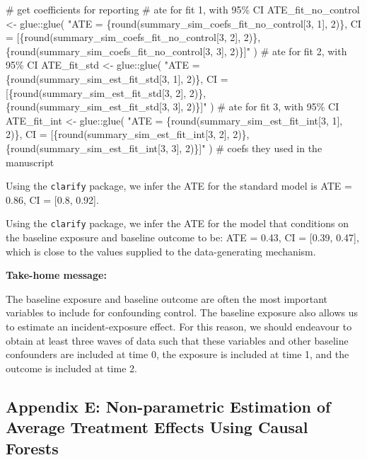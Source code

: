 \documentclass[
  singlecolumn]{article}
\newenvironment{Shaded}{}{}
\newcommand{\CommentTok}[1]{\textcolor[rgb]{0.42,0.45,0.49}{#1}}
\newcommand{\FunctionTok}[1]{\textcolor[rgb]{0.44,0.26,0.76}{#1}}
\newcommand{\NormalTok}[1]{\textcolor[rgb]{0.14,0.16,0.18}{#1}}
\newcommand{\OtherTok}[1]{\textcolor[rgb]{0.44,0.26,0.76}{#1}}
\newcommand{\SpecialCharTok}[1]{\textcolor[rgb]{0.00,0.36,0.77}{#1}}
\newcommand{\StringTok}[1]{\textcolor[rgb]{0.01,0.18,0.38}{#1}}
\begin{document}
\begin{Shaded}
\begin{Highlighting}[]
\CommentTok{\# get coefficients for reporting}
\CommentTok{\# ate for fit 1, with 95\% CI}
\NormalTok{ATE\_fit\_no\_control  }\OtherTok{\textless{}{-}}\NormalTok{ glue}\SpecialCharTok{::}\FunctionTok{glue}\NormalTok{(}
  \StringTok{"ATE = \{round(summary\_sim\_coefs\_fit\_no\_control[3, 1], 2)\}, }
\StringTok{  CI = [\{round(summary\_sim\_coefs\_fit\_no\_control[3, 2], 2)\},}
\StringTok{  \{round(summary\_sim\_coefs\_fit\_no\_control[3, 3], 2)\}]"}
\NormalTok{)}
\CommentTok{\# ate for fit 2, with 95\% CI}
\NormalTok{ATE\_fit\_std }\OtherTok{\textless{}{-}}\NormalTok{ glue}\SpecialCharTok{::}\FunctionTok{glue}\NormalTok{(}
  \StringTok{"ATE = \{round(summary\_sim\_est\_fit\_std[3, 1], 2)\}, }
\StringTok{  CI = [\{round(summary\_sim\_est\_fit\_std[3, 2], 2)\},}
\StringTok{  \{round(summary\_sim\_est\_fit\_std[3, 3], 2)\}]"}
\NormalTok{)}
\CommentTok{\# ate for fit 3, with 95\% CI}
\NormalTok{ATE\_fit\_int }\OtherTok{\textless{}{-}}
\NormalTok{  glue}\SpecialCharTok{::}\FunctionTok{glue}\NormalTok{(}
    \StringTok{"ATE = \{round(summary\_sim\_est\_fit\_int[3, 1], 2)\},}
\StringTok{    CI = [\{round(summary\_sim\_est\_fit\_int[3, 2], 2)\},}
\StringTok{    \{round(summary\_sim\_est\_fit\_int[3, 3], 2)\}]"}
\NormalTok{  )}
\CommentTok{\# coefs they used in the manuscript}
\end{Highlighting}
\end{Shaded}

Using the \texttt{clarify} package, we infer the ATE for the standard
model is ATE = 0.86, CI = {[}0.8, 0.92{]}.

Using the \texttt{clarify} package, we infer the ATE for the model that
conditions on the baseline exposure and baseline outcome to be: ATE =
0.43, CI = {[}0.39, 0.47{]}, which is close to the values supplied to
the data-generating mechanism.

\textbf{Take-home message:}

The baseline exposure and baseline outcome are often the most important
variables to include for confounding control. The baseline exposure also
allows us to estimate an incident-exposure effect. For this reason, we
should endeavour to obtain at least three waves of data such that these
variables and other baseline confounders are included at time 0, the
exposure is included at time 1, and the outcome is included at time 2.

\newpage{}

\subsection{Appendix E: Non-parametric Estimation of Average Treatment
Effects Using Causal Forests}\label{appendix-causal-forests}
\end{document}
